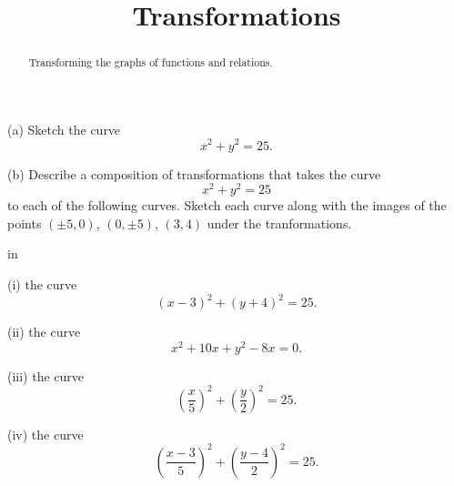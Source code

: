 \documentclass{ximera}
\title{Transformations}
\newcommand{\pskip}{\vskip 0.1 in}
\begin{document}
\begin{abstract}
Transforming the graphs of functions and relations.
\end{abstract}
\maketitle



\begin{question}  \label{Q:324bt44t}
(a) Sketch the curve
\[
    x^2 + y^2 = 25 .
\]

(b) Describe a composition of transformations that takes the curve
\[
        x^2 + y^2 = 25
\]
to each of the following curves. Sketch each curve along with the images of the points $(\pm 5,0)$, $(0,\pm 5)$, $(3,4)$ under the tranformations.

\pskip

(i) the curve
\[
          (x-3)^2 + (y+4)^2 = 25 .
\]

(ii)  the curve
\[
          x^2 +10x +y^2 - 8x = 0 .
\]

(iii) the curve
\[
       \left( \frac{x}{5} \right)^2 + \left( \frac{y}{2} \right)^2 = 25 .
\]

(iv) the curve
\[
       \left( \frac{x-3}{5} \right)^2 + \left( \frac{y-4}{2} \right)^2 = 25 .
\]

\end{question}
\end{document}
